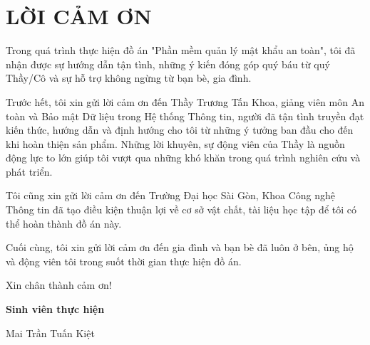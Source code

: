 \chapter*{LỜI CẢM ƠN}

Trong quá trình thực hiện đồ án "Phần mềm quản lý mật khẩu an toàn", tôi đã nhận được sự hướng dẫn tận tình, những ý kiến đóng góp quý báu từ quý Thầy/Cô và sự hỗ trợ không ngừng từ bạn bè, gia đình.

Trước hết, tôi xin gửi lời cảm ơn đến Thầy Trương Tấn Khoa, giảng viên môn An toàn và Bảo mật Dữ liệu trong Hệ thống Thông tin, người đã tận tình truyền đạt kiến thức, hướng dẫn và định hướng cho tôi từ những ý tưởng ban đầu cho đến khi hoàn thiện sản phẩm. Những lời khuyên, sự động viên của Thầy là nguồn động lực to lớn giúp tôi vượt qua những khó khăn trong quá trình nghiên cứu và phát triển.

Tôi cũng xin gửi lời cảm ơn đến Trường Đại học Sài Gòn, Khoa Công nghệ Thông tin đã tạo điều kiện thuận lợi về cơ sở vật chất, tài liệu học tập để tôi có thể hoàn thành đồ án này.

Cuối cùng, tôi xin gửi lời cảm ơn đến gia đình và bạn bè đã luôn ở bên, ủng hộ và động viên tôi trong suốt thời gian thực hiện đồ án.

Xin chân thành cảm ơn!

\vspace{1cm}
\begin{flushright}
\textbf{Sinh viên thực hiện}\par
Mai Trần Tuấn Kiệt\par
\end{flushright}
\newpage